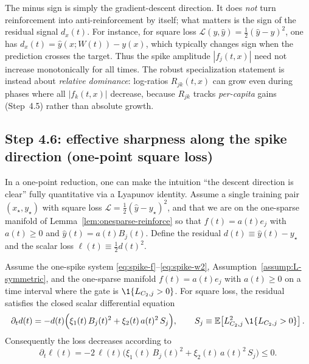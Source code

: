 \begin{remark}[The ``minus sign'' in $\partial_t f_k=-\xi_1 d\,B_k$ does not break specialization]\label{rem:minus-sign}
The minus sign is simply the gradient-descent direction.
It does \emph{not} turn reinforcement into anti-reinforcement by itself; what matters is the sign of the residual signal $d_x(t)$.
For instance, for square loss $\mathcal{L}(y,\hat y)=\tfrac12(\hat y-y)^2$, one has $d_x(t)=\hat y(x;W(t))-y(x)$, which typically changes sign when the prediction crosses the target.
Thus the spike amplitude $|f_j(t,x)|$ need not increase monotonically for all times.
The robust specialization statement is instead about \emph{relative dominance}:
log-ratios $R_{jk}(t,x)$ can grow even during phases where all $|f_k(t,x)|$ decrease, because $R_{jk}$ tracks \emph{per-capita} gains (Step~4.5) rather than absolute growth.
\end{remark}

\subsection{Step 4.6: effective sharpness along the spike direction (one-point square loss)}\label{subsec:step46}

In a one-point reduction, one can make the intuition ``the descent direction is clear'' fully quantitative via a Lyapunov identity.
Assume a single training pair $(x_\star,y_\star)$ with square loss $\mathcal{L}=\tfrac12(\hat y-y_\star)^2$, and that we are on the one-sparse manifold of Lemma~\ref{lem:onesparse-reinforce} so that $f(t)=a(t)e_j$ with $a(t)\ge 0$ and $\hat y(t)=a(t)B_j(t)$.
Define the residual $d(t)\equiv \hat y(t)-y_\star$ and the scalar loss $\ell(t)\equiv \tfrac12 d(t)^2$.

\begin{lemma}\label{lem:lyapunov-onespike}
\provedflag
Assume the one-spike system \eqref{eq:spike-f}--\eqref{eq:spike-w2}, Assumption~\ref{assump:L-symmetric}, and the one-sparse manifold $f(t)=a(t)e_j$ with $a(t)\ge 0$ on a time interval where the gate is $\1\{L_{C_2,j}>0\}$.
For square loss, the residual satisfies the closed scalar differential equation
\begin{equation}\label{eq:d-dissipative}
\partial_t d(t)=-d(t)\Big(\xi_1(t)\,B_j(t)^2+\xi_2(t)\,a(t)^2\,S_j\Big),
\qquad
S_j\equiv \E\!\left[L_{C_2,j}^2\,\1\{L_{C_2,j}>0\}\right].
\end{equation}
Consequently the loss decreases according to
\begin{equation}\label{eq:ell-dissipative}
\partial_t \ell(t)=-2\,\ell(t)\Big(\xi_1(t)\,B_j(t)^2+\xi_2(t)\,a(t)^2\,S_j\Big)\le 0.
\end{equation}
\end{lemma}

